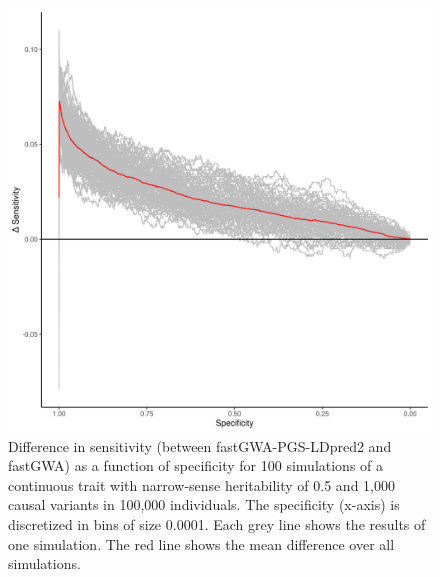 \documentclass[fleqn,10pt]{wlscirep}
\begin{document}
\begin{figure}
\centering
\includegraphics[width=120mm]{images/fig2_fGWA_LDpred2}
\caption{Difference in sensitivity (between fastGWA-PGS-LDpred2 and fastGWA) as a function of specificity for 100 simulations of a continuous trait with narrow-sense heritability of 0.5 and 1,000 causal variants in 100,000 individuals. The specificity (x-axis) is discretized in bins of size 0.0001. Each grey line shows the results of one simulation. The red line shows the mean difference over all simulations. }
\label{fig:deltaROC curves}
\end{figure}
\end{document}
